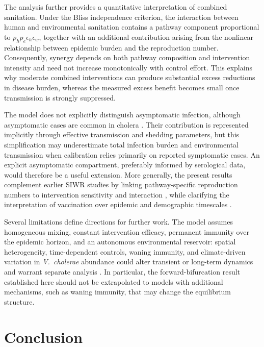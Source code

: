\documentclass[11pt]{article}
\theoremstyle{plain}
\theoremstyle{definition}
\theoremstyle{remark}
\begin{document}
The analysis further provides a quantitative interpretation of combined sanitation. Under the Bliss independence criterion, the interaction between human and environmental sanitation contains a pathway component proportional to $p_hp_e\epsilon_h\epsilon_w$, together with an additional contribution arising from the nonlinear relationship between epidemic burden and the reproduction number. Consequently, synergy depends on both pathway composition and intervention intensity and need not increase monotonically with control effort. This explains why moderate combined interventions can produce substantial excess reductions in disease burden, whereas the measured excess benefit becomes small once transmission is strongly suppressed.

The model does not explicitly distinguish asymptomatic infection, although asymptomatic cases are common in cholera \cite{king2008inapparent,nelson2009transmission}. Their contribution is represented implicitly through effective transmission and shedding parameters, but this simplification may underestimate total infection burden and environmental transmission when calibration relies primarily on reported symptomatic cases. An explicit asymptomatic compartment, preferably informed by serological data, would therefore be a useful extension. More generally, the present results complement earlier SIWR studies by linking pathway-specific reproduction numbers to intervention sensitivity and interaction \cite{codeco2001endemic,tien2010multiple,mukandavire2011estimating}, while clarifying the interpretation of vaccination over epidemic and demographic timescales \cite{azman2015impact}.

Several limitations define directions for further work. The model assumes homogeneous mixing, constant intervention efficacy, permanent immunity over the epidemic horizon, and an autonomous environmental reservoir: spatial heterogeneity, time-dependent controls, waning immunity, and climate-driven variation in \emph{V.~cholerae} abundance could alter transient or long-term dynamics and warrant separate analysis \cite{alsammani2025impact,azman2013incubation,abdulrashid2019stability,Koelle2005,Pascual2002}. In particular, the forward-bifurcation result established here should not be extrapolated to models with additional mechanisms, such as waning immunity, that may change the equilibrium structure.

\section{Conclusion}\label{sec6}
\end{document}
